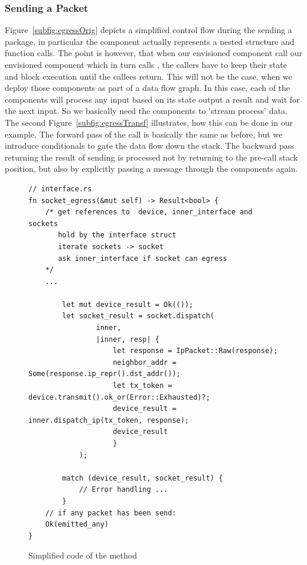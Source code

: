 \subsubsection{Sending a Packet}
Figure~\ref{subfig:egressOrig} depicts a simplified control flow during the sending a package, in particular the  component actually represents a nested structure and function calls. The point is however, that when our envisioned component  call our envisioned component  which in turn calls , the callers have to keep their state and block execution until the callees return. This will not be the case, when we deploy those components as part of a data flow graph. In this case, each of the components will process any input based on its state output a result and wait for the next input. So we basically need the components to 'stream process' data. The second Figure~\ref{subfig:egressTransf} illustrates, how this can be done in our example. The forward pass of the call is basically the same as before, but we introduce conditionals to gate the data flow down the stack. The backward pass returning the result of sending is processed not by returning to the pre-call stack position, but also by explicitly passing a message through the components again. 


\begin{figure}[H]
    \centering
    
\begin{verbatim}
// interface.rs
fn socket_egress(&mut self) -> Result<bool> {
    /* get references to  device, inner_interface and sockets
       hold by the interface struct
       iterate sockets -> socket
       ask inner_interface if socket can egress
    */
    ...
        
        let mut device_result = Ok(());
        let socket_result = socket.dispatch(
                inner, 
                |inner, resp| {
                    let response = IpPacket::Raw(response);
                    neighbor_addr = Some(response.ip_repr().dst_addr());
                    let tx_token = device.transmit().ok_or(Error::Exhausted)?;
                    device_result = inner.dispatch_ip(tx_token, response);
                    device_result
                    }
            );

        match (device_result, socket_result) {
            // Error handling ...
        }
    // if any packet has been send:
    Ok(emitted_any)
}
\end{verbatim}
    \caption{Simplified code of the  method}
    \label{fig:egressCode}
\end{figure}


